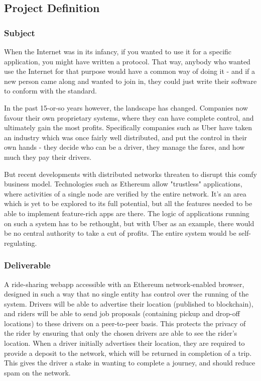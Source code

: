 \subsection*{Project Definition}

\subsubsection*{Subject}

When the Internet was in its infancy, if you wanted to use it for a specific application, you might have written a protocol. That way, anybody who wanted use the Internet for that purpose would have a common way of doing it - and if a new person came along and wanted to join in, they could just write their software to conform with the standard.

In the past 15-or-so years however, the landscape has changed. Companies now favour their own proprietary systems, where they can have complete control, and ultimately gain the most profits. Specifically companies such as Uber have taken an industry which was once fairly well distributed, and put the control in their own hands - they decide who can be a driver, they manage the fares, and how much they pay their drivers.

But recent developments with distributed networks threaten to disrupt this comfy business model. Technologies such as Ethereum allow "trustless" applications, where activities of a single node are verified by the entire network. It's an area which is yet to be explored to its full potential, but all the features needed to be able to implement feature-rich apps are there. The logic of applications running on such a system has to be rethought, but with Uber as an example, there would be no central authority to take a cut of profits. The entire system would be self-regulating.

\subsubsection*{Deliverable}

A ride-sharing webapp accessible with an Ethereum network-enabled browser, designed in such a way that no single entity has control over the running of the system. Drivers will be able to advertise their location (published to blockchain), and riders will be able to send job proposals (containing pickup and drop-off locations) to these drivers on a peer-to-peer basis. This protects the privacy of the rider by ensuring that only the chosen drivers are able to see the rider’s location. When a driver initially advertises their location, they are required to provide a deposit to the network, which will be returned in completion of a trip. This gives the driver a stake in wanting to complete a journey, and should reduce spam on the network.

